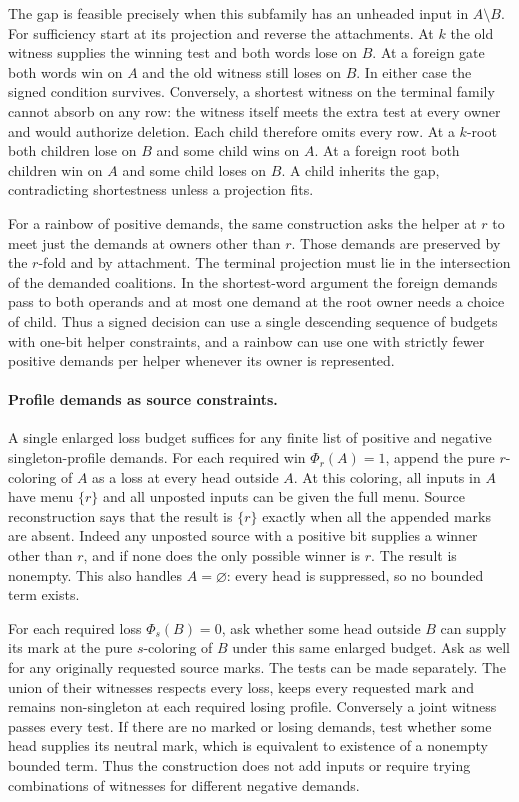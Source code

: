 The gap is feasible precisely when this subfamily
has an unheaded input in $A\setminus B$. For
sufficiency start at its projection and reverse the
attachments. At $k$ the old witness supplies the
winning test and both words lose on $B$. At a foreign
gate both words win on $A$ and the old witness still
loses on $B$. In either case the signed condition
survives. Conversely, a shortest witness on the
terminal family cannot absorb on any row: the
witness itself meets the extra test at every owner
and would authorize deletion. Each child therefore
omits every row. At a $k$-root both children lose on
$B$ and some child wins on $A$. At a foreign root
both children win on $A$ and some child loses on
$B$. A child inherits the gap, contradicting
shortestness unless a projection fits.

For a rainbow of positive demands, the same
construction asks the helper at $r$ to meet just
the demands at owners other than $r$. Those demands
are preserved by the $r$-fold and by attachment.
The terminal projection must lie in the intersection
of the demanded coalitions. In the shortest-word
argument the foreign demands pass to both operands
and at most one demand at the root owner needs a
choice of child. Thus a signed decision can use a
single descending sequence of budgets with one-bit
helper constraints, and a rainbow can use one with
strictly fewer positive demands per helper whenever
its owner is represented.

\paragraph{Profile demands as source constraints.}
A single enlarged loss budget suffices for any finite
list of positive and negative singleton-profile demands.
For each required win $\Phi_r(A)=1$, append the pure
$r$-coloring of $A$ as a loss at every head outside
$A$. At this coloring, all inputs in $A$ have menu
$\{r\}$ and all unposted inputs can be given the full
menu. Source reconstruction says that the result is
$\{r\}$ exactly when all the appended marks are
absent. Indeed any unposted source with a positive
bit supplies a winner other than $r$, and if none
does the only possible winner is $r$. The result is
nonempty. This also handles $A=\varnothing$: every
head is suppressed, so no bounded term exists.

For each required loss $\Phi_s(B)=0$, ask whether
some head outside $B$ can supply its mark at the
pure $s$-coloring of $B$ under this same enlarged
budget. Ask as well for any originally requested
source marks. The tests can be made separately.
The union of their witnesses respects every loss,
keeps every requested mark and remains non-singleton
at each required losing profile. Conversely a joint
witness passes every test. If there are no marked
or losing demands, test whether some head supplies
its neutral mark, which is equivalent to existence
of a nonempty bounded term. Thus the construction
does not add inputs or require trying combinations
of witnesses for different negative demands.

